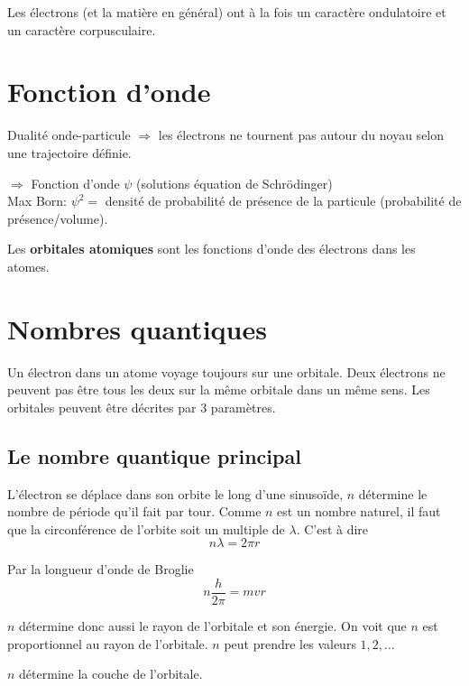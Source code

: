 Les électrons (et la matière en général) ont à la fois un caractère ondulatoire et un caractère corpusculaire.


\section{Fonction d'onde}

Dualité onde-particule $\Rightarrow$ les électrons ne tournent pas autour du noyau selon une trajectoire définie.

$\Rightarrow$ Fonction d'onde $\psi$ (solutions équation de Schrödinger)\\

Max Born: $\psi^2 = $ densité de probabilité de présence de la particule (probabilité de présence/volume).

Les \textbf{orbitales atomiques} sont les fonctions d'onde des électrons dans les atomes.

\section{Nombres quantiques}

Un électron dans un atome voyage toujours sur une orbitale.
Deux électrons ne peuvent pas être tous les deux
sur la même orbitale dans un même sens.
Les orbitales peuvent être décrites par 3 paramètres.

\subsection{Le nombre quantique principal}
L'électron se déplace dans son orbite le long d'une sinusoïde,
$n$ détermine le nombre de période qu'il fait par tour.
Comme $n$ est un nombre naturel,
il faut que la circonférence de l'orbite soit un multiple de $\lambda$.
C'est à dire
\[ n\lambda = 2\pi r \]

Par la longueur d'onde de Broglie
\[ n \frac{h}{2\pi} = m v r \]

$n$ détermine donc aussi le rayon de l'orbitale et son énergie.
On voit que $n$ est proportionnel au rayon de l'orbitale.
$n$ peut prendre les valeurs $1, 2, \ldots$

$n$ détermine la couche de l'orbitale.

